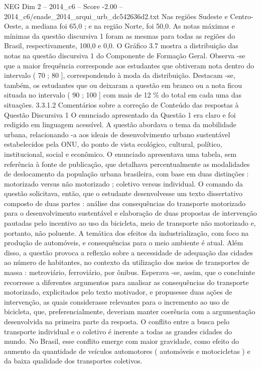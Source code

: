 \begin{textsample}{NEG Dim 2 – 2014\_c6 – Score -2.00 – 2014\_c6/enade\_2014\_arqui\_urb\_dc542636d2.txt}
Nas regiões Sudeste e Centro-Oeste, a mediana foi 65,0 ; e na região Norte, foi 50,0.
As notas máximas e mínimas da questão discursiva 1 foram as mesmas para todas as regiões do Brasil, respectivamente, 100,0 e 0,0.
O Gráfico 3.7 mostra a distribuição das notas na questão discursiva 1 do Componente de Formação Geral.
Observa -se que a maior frequência corresponde aos estudantes que obtiveram nota dentro do intervalo ( 70 ; 80 ], correspondendo à moda da distribuição.
Destacam -se, também, os estudantes que ou deixaram a questão em branco ou a nota ficou situada no intervalo ( 90 ; 100 ] com mais de 12 \% do total em cada uma das situações. 3.3.1.2 Comentários sobre a correção de Conteúdo das respostas à Questão Discursiva 1 O enunciado apresentado da Questão 1 era claro e foi redigido em linguagem acessível.
A questão abordava o tema da mobilidade urbana, relacionando -a aos ideais de desenvolvimento urbano sustentável estabelecidos pela ONU, do ponto de vista ecológico, cultural, político, institucional, social e econômico.
O enunciado apresentava uma tabela, sem referência à fonte de publicação, que detalhava percentualmente as modalidades de deslocamento da população urbana brasileira, com base em duas distinções : motorizado versus não motorizado ; coletivo versus individual.
O comando da questão solicitava, então, que o estudante desenvolvesse um texto dissertativo composto de duas partes : análise das consequências do transporte motorizado para o desenvolvimento sustentável e elaboração de duas propostas de intervenção pautadas pelo incentivo ao uso da bicicleta, meio de transporte não motorizado e, portanto, não poluente.
A temática dos efeitos da industrialização, com foco na produção de automóveis, e consequências para o meio ambiente é atual.
Além disso, a questão provoca a reflexão sobre a necessidade de adequação das cidades ao número de habitantes, no contexto da utilização dos meios de transportes de massa : metroviário, ferroviário, por ônibus.
Esperava -se, assim, que o concluinte recorresse a diferentes argumentos para analisar as consequências do transporte motorizado, explicitados pelo texto motivador, e propusesse duas ações de intervenção, as quais considerasse relevantes para o incremento ao uso de bicicleta, que, preferencialmente, deveriam manter coerência com a argumentação desenvolvida na primeira parte da resposta.
O conflito entre a busca pelo transporte individual e o coletivo é inerente a todas as grandes cidades do mundo.
No Brasil, esse conflito emerge com maior gravidade, como efeito do aumento da quantidade de veículos automotores ( automóveis e motocicletas ) e da baixa qualidade dos transportes coletivos.

\end{textsample}
